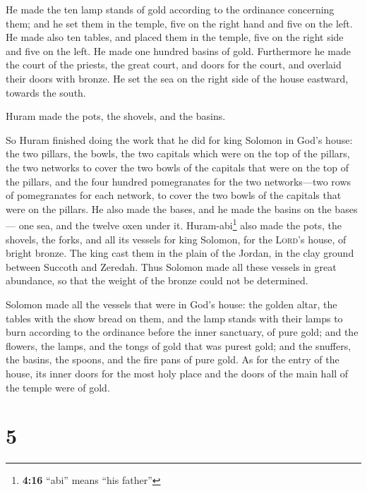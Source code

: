  He made the ten lamp stands of gold according to the
ordinance concerning them; and he set them in the temple, five on the
right hand and five on the left.  He made also ten tables,
and placed them in the temple, five on the right side and five on the
left. He made one hundred basins of gold.  Furthermore he
made the court of the priests, the great court, and doors for the court,
and overlaid their doors with bronze.  He set the sea on
the right side of the house eastward, towards the south.

 Huram made the pots, the shovels, and the basins.

So Huram finished doing the work that he did for king Solomon in God's
house:  the two pillars, the bowls, the two capitals
which were on the top of the pillars, the two networks to cover the two
bowls of the capitals that were on the top of the pillars,
 and the four hundred pomegranates for the two
networks---two rows of pomegranates for each network, to cover the two
bowls of the capitals that were on the pillars.  He also
made the bases, and he made the basins on the bases--- 
one sea, and the twelve oxen under it. 
Huram-abi\footnote{\textbf{4:16} ``abi'' means ``his father''} also made
the pots, the shovels, the forks, and all its vessels for king Solomon,
for the \textsc{Lord}'s house, of bright bronze.  The
king cast them in the plain of the Jordan, in the clay ground between
Succoth and Zeredah.  Thus Solomon made all these vessels
in great abundance, so that the weight of the bronze could not be
determined.

 Solomon made all the vessels that were in God's house:
the golden altar, the tables with the show bread on them,
 and the lamp stands with their lamps to burn according
to the ordinance before the inner sanctuary, of pure gold;
 and the flowers, the lamps, and the tongs of gold that
was purest gold;  and the snuffers, the basins, the
spoons, and the fire pans of pure gold. As for the entry of the house,
its inner doors for the most holy place and the doors of the main hall
of the temple were of gold.

\hypertarget{section-4}{%
\section{5}\label{section-4}}

